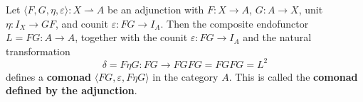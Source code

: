 Let $\langle F, G, \eta, \varepsilon \rangle : X \rightharpoonup A$ be an adjunction with
$F: X \to A$, $G: A \to X$, unit $\eta: I_X \to GF$, and counit $\varepsilon: FG \to I_A$.
Then the composite endofunctor $L = FG: A \to A$, together with the counit $\varepsilon: FG \to I_A$
and the natural transformation
$$\delta = F\eta G: FG \to FGFG = FG FG = L^2$$
defines a \textbf{comonad} $\langle FG, \varepsilon, F\eta G \rangle$ in the category $A$.
This is called the \textbf{comonad defined by the adjunction}.
